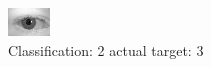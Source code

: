 \begin{figure}[h!]
\begin{center}
\includegraphics[width=0.60\columnwidth]{figures/ID520_class_2_target_3.png}
\end{center}
\caption{ Classification: 2 actual target: 3}
\label{fig:ID520_class_2_target_3}
\end{figure}
